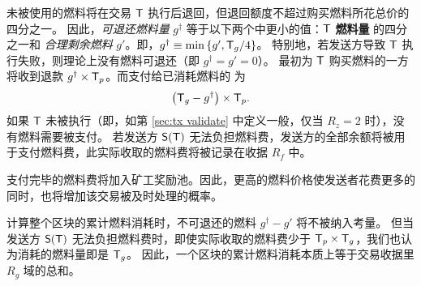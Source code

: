 未被使用的燃料将在交易 $\textsf{T}$ 执行后退回，但退回额度不超过购买燃料所花总价的四分之一。
因此，\emph{可退还燃料量} $g^{\dagger}$ 等于以下两个中更小的值：$\textsf{T}$ \textbf{燃料量} 的四分之一和 \emph{合理剩余燃料} $g'$。即，$g^{\dagger}\equiv \min{\left \{{g', \textsf{T}_g/4} \right \}}$。
特别地，若发送方导致 $\textsf{T}$ 执行失败，则理论上没有燃料可退还（即 $g^{\dagger} = g' = 0$）。
最初为 $\textsf{T}$ 购买燃料的一方将收到退款 $g^{\dagger}\times\textsf{T}_p$。而支付给已消耗燃料的 \coinsign 为
	\begin{align}
		\left(\textsf{T}_g-g^{\dagger}\right)\times \textsf{T}_p.
	\end{align}
如果 $\textsf{T}$ 未被执行（即，如第 \ref{sec:tx validate} 中定义一般，仅当 $R_z=2$ 时），没有燃料需要被支付。
若发送方 $\mathsf{S}{\left({\textsf{T}} \right)}$ 无法负担燃料费，发送方的全部余额将被用于支付燃料费，此实际收取的燃料费将被记录在收据 $R_f$ 中。


支付完毕的燃料费将加入矿工奖励池。因此，更高的燃料价格使发送者花费更多的同时，也将增加该交易被及时处理的概率。


计算整个区块的累计燃料消耗时，不可退还的燃料 $g^{\dagger} - g'$ 将不被纳入考量。
但当发送方 $\mathsf{S}{\left({\textsf{T}} \right)}$ 无法负担燃料费时，即使实际收取的燃料费少于 $\textsf{T}_p\times\textsf{T}_g$，我们也认为消耗的燃料量即是 $\textsf{T}_g$。
因此，一个区块的累计燃料消耗本质上等于交易收据里 $R_g$ 域的总和。


